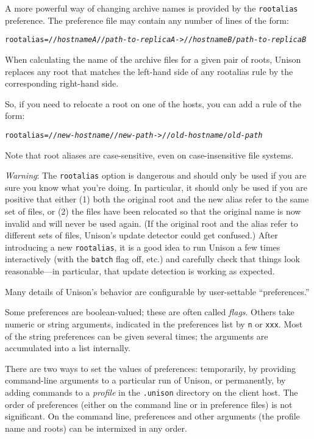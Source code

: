 \documentclass{article}
\newcommand{\NT}[1]{\textit{#1}}
\begin{document}
A more powerful way of changing archive names is provided by the
\verb|rootalias| preference.  The preference file may contain any number of
lines of the form:
\begin{alltt}
    rootalias = //\NT{hostnameA}//\NT{path-to-replicaA} -> //\NT{hostnameB}/\NT{path-to-replicaB}
\end{alltt}
When calculating the name of the archive files for a given pair of roots,
Unison replaces any root that matches the left-hand side of any rootalias
rule by the corresponding right-hand side.

So, if you need to relocate a root on one of the hosts, you can add a
rule of the form:
\begin{alltt}
    rootalias = //\NT{new-hostname}//\NT{new-path} -> //\NT{old-hostname}/\NT{old-path}
\end{alltt}
Note that root aliases are case-sensitive, even on case-insensitive file
systems.

{\em Warning}: The \verb|rootalias| option is dangerous and should only
be used if you are sure you know what you're doing.  In particular, it
should only be used if you are positive that either (1) both the original
root and the new alias refer to the same set of files, or (2) the files
have been relocated so that the original name is now invalid and will
never be used again.  (If the original root and the alias refer to
different sets of files, Unison's update detector could get confused.)
%
After introducing a new \verb|rootalias|, it is a good idea to run Unison
a few times interactively (with the \verb|batch| flag off, etc.) and
carefully check that things look reasonable---in particular, that update
detection is working as expected.



Many details of Unison's behavior are configurable by user-settable
``preferences.''

Some preferences are boolean-valued; these are often called {\em flags}.
Others take numeric or string arguments, indicated in the preferences
list by {\tt n} or {\tt xxx}.  Most of the string preferences can be
given several times; the arguments are accumulated into a list
internally.

There are two ways to set the values of preferences: temporarily, by
providing command-line arguments to a particular run of Unison, or
permanently, by adding commands to a {\em profile} in the {\tt .unison}
directory on the client host.  The order of preferences (either on the
command line or in preference files) is not significant.  On the command
line, preferences and other arguments (the profile name and roots) can be
intermixed in any order.
\end{document}
